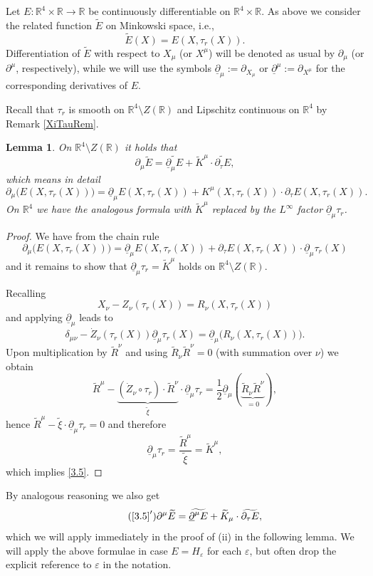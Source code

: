 \documentclass[sumlimits,intlimits,namelimits%
]{amsart}
\newcommand{\mb}[1]{\ensuremath{\mathbb{#1}}}
\newcommand{\R}{\mb{R}}
\renewcommand{\d}{\ensuremath{\partial}}
\newtheorem{lemma}[theorem]{Lemma}
\theoremstyle{definition}
\newcommand{\beq}{\begin{equation}}
\newcommand{\eeq}{\end{equation}}
\newcommand{\col}{\colon}
\newcommand{\de}{\delta}
\newcommand{\eps}{\varepsilon}
\newcommand{\ud}{\underline{\d}}
\begin{document}
Let $E \col \R^4 \times \R \to \R$ be continuously differentiable on $\R^4 \times \R$. As above we consider the related function $\widetilde{E}$ on Minkowski space, i.e., 
$$
  \widetilde{E}(X) = E(X, \tau_r(X)).
$$
Differentiation of $\widetilde{E}$ with respect to $X_\mu$ (or $X^\mu$) will be denoted as usual by $\d_\mu$ (or $\d^\mu$, respectively), while we will use the symbols $\ud_\mu := \d_{X_\mu}$ or $\ud^\mu := \d_{X^\mu}$ for the corresponding derivatives of $E$. 

Recall that $\tau_r$ is smooth on $\R^4 \setminus Z(\R)$ and Lipschitz continuous on $\R^4$ by Remark \ref{XiTauRem}.

\begin{lemma}
On $\R^4 \setminus Z(\R)$ it holds that
\beq\label{3.5}
\d_\mu \widetilde{E} = \widetilde{\ud_\mu E}  + \widetilde{K}^\mu \cdot \widetilde{\d_\tau E},
\eeq
which means in detail
\beq\label{3.5V}
   \d_\mu \Big( E(X,\tau_r(X)) \Big) = \ud_\mu E(X,\tau_r(X)) + K^\mu(X,\tau_r(X)) \cdot \d_\tau E(X,\tau_r(X)).
\eeq
On $\R^4$ we have the analogous formula with $\widetilde{K}^\mu$ replaced by the $L^\infty$ factor $\ud_\mu \tau_r$.
\end{lemma}

\begin{proof} We have from the chain rule
$$
\d_\mu \Big( E(X,\tau_r(X)) \Big)   
  = \ud_\mu E(X,\tau_r(X)) +  \d_\tau E(X,\tau_r(X)) \cdot \ud_\mu \tau_r(X)
$$
and it remains to show that $\ud_\mu \tau_r = \widetilde{K}^\mu$ holds on $\R^4 \setminus Z(\R)$.


Recalling 
\[
X_\nu-Z_\nu(\tau_r(X)) = R_\nu(X,\tau_r(X))
\]
and applying $\ud_\mu$ leads to
\[
\de_{\mu \nu} -\dot{Z}_\nu (\tau_r(X)) \ud_\mu \tau_r (X) = \ud_\mu \Big( R_\nu(X,\tau_r(X)) \Big).
\]
Upon multiplication by $\widetilde{R}^\nu$ and using $\widetilde{R}_\nu \widetilde{R}^\nu=0$ (with summation over $\nu$) we obtain
\[
 \widetilde{R}^\mu - \underbrace{(\dot{Z}_\nu \circ \tau_r) \cdot  \widetilde{R}^\nu}_{\widetilde{\xi}} \cdot \ud_\mu \tau_r 
    = \frac{1}{2}\ud_\mu(\underbrace{\widetilde{R}_\nu \widetilde{R}^\nu}_{=0}),
\]
hence $\widetilde{R}^\mu - \widetilde{\xi} \cdot \ud_\mu \tau_r = 0$ and therefore
\[
 \ud_\mu \tau_r = \frac{\widetilde{R}^\mu}{\widetilde{\xi}} = \widetilde{K}^\mu,
\]
which implies \eqref{3.5}.
\end{proof}

By analogous reasoning we also get
\beq \tag{$\text{\ref{3.5}}'$} \label{3.5s}
\d^\mu \widetilde{E} = \widetilde{\ud^\mu E}  + \widetilde{K}_\mu \cdot \widetilde{\d_\tau E},
\eeq
which we will apply immediately in the proof of (ii) in  the following lemma. We will apply the above formulae in case $E = H_\eps$ for each $\eps$, but often drop the explicit reference to $\eps$ in the notation.
\end{document}
